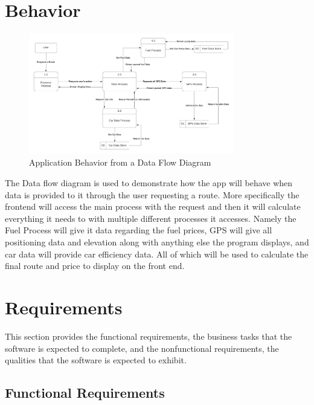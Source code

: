 \documentclass[12pt]{article}
\begin{document}
\newpage
\section{Behavior}

\begin{figure}[h!]
  \begin{center}
   \includegraphics[width=0.8\textwidth]{DataFlowDiagram.png}
  \caption{Application Behavior from a Data Flow Diagram}
  \label{Fig_DataFlow} 
  \end{center}
\end{figure}

The Data flow diagram is used to demonstrate how the app will behave when data is provided to it through the user requesting a route. More specifically the frontend will access the main process with the request and then it will calculate everything it needs to with multiple different processes it accesses. Namely the Fuel Process will give it data regarding the fuel prices, GPS will give all positioning data and elevation along with anything else the program displays, and car data will provide car efficiency data. All of which will be used to calculate the final route and price to display on the front end. 

\newpage
\section{Requirements}

This section provides the functional requirements, the business tasks that the
software is expected to complete, and the nonfunctional requirements, the
qualities that the software is expected to exhibit.

\subsection{Functional Requirements}
\end{document}
